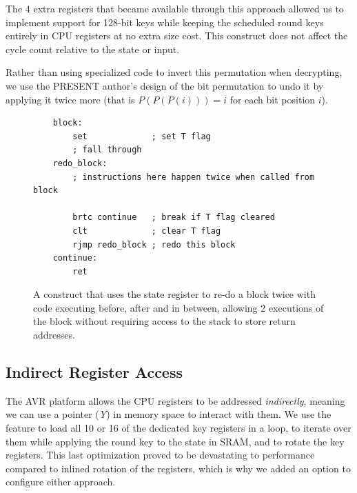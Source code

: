 \documentclass[11pt]{llncs2e} %
\begin{document}

The 4 extra registers that became available through this approach allowed us to implement support for 128-bit keys while keeping the scheduled round keys entirely in CPU registers at no extra size cost.
This construct does not affect the cycle count relative to the state or input.

Rather than using specialized code to invert this permutation when decrypting, we use the PRESENT author's design of the bit permutation to undo it by applying it twice more (that is $P(P(P(i))) = i$ for each bit position $i$).
\begin{figure}[H]
\centering
	\begin{lstlisting}
	block:
		set             ; set T flag
		; fall through
	redo_block:
		; instructions here happen twice when called from block

		brtc continue   ; break if T flag cleared
		clt             ; clear T flag
		rjmp redo_block ; redo this block
	continue:
		ret
	\end{lstlisting}
	\caption{\footnotesize A construct that uses the state register to re-do a block twice with code executing before, after and in between, allowing 2 executions of the block without requiring access to the stack to store return addresses.}
\label{sreg_redo}
\end{figure}




\subsection{Indirect Register Access}
\label{indirect}
The AVR platform allows the CPU registers to be addressed \textit{indirectly}, meaning we can use a pointer (\textit{Y}) in memory space to interact with them.
We use the feature to load all 10 or 16 of the dedicated key registers in a loop, to iterate over them while applying the round key to the state in SRAM, and to rotate the key registers.
This last optimization proved to be devastating to performance compared to inlined rotation of the registers, which is why we added an option to configure either approach.
\end{document}
